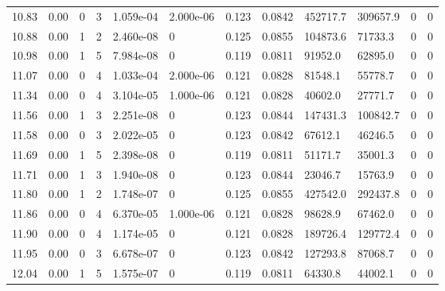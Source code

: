 \documentclass[preview]{standalone}
\begin{document}
{{{\begin{tabular}{L{1.2cm}C{1.2cm} C{0.3cm}C{0.5cm} C{1.4cm}C{1.4cm} C{1.4cm}C{1.4cm} C{1.6cm}C{1.6cm} C{1.6cm}C{1.6cm}}
  10.83  &  0.00  & 0     &  3 &  1.059e-04  & 2.000e-06  &  0.123&   0.0842& 452717.7 & 309657.9   &  0 & 0  \\ 
  10.88  &  0.00  & 1     &  2 &  2.460e-08  & 0  &  0.125&   0.0855& 104873.6 & 71733.3   &  0 & 0  \\ 
  10.98  &  0.00  & 1     &  5 &  7.984e-08  & 0  &  0.119&   0.0811& 91952.0 & 62895.0   &  0 & 0  \\ 
  11.07  &  0.00  & 0     &  4 &  1.033e-04  & 2.000e-06  &  0.121&   0.0828& 81548.1 & 55778.7   &  0 & 0  \\ 
  11.34  &  0.00  & 0     &  4 &  3.104e-05  & 1.000e-06  &  0.121&   0.0828& 40602.0 & 27771.7   &  0 & 0  \\ 
  11.56  &  0.00  & 1     &  3 &  2.251e-08  & 0  &  0.123&   0.0844& 147431.3 & 100842.7   &  0 & 0  \\ 
  11.58  &  0.00  & 0     &  3 &  2.022e-05  & 0  &  0.123&   0.0842& 67612.1 & 46246.5   &  0 & 0  \\ 
  11.69  &  0.00  & 1     &  5 &  2.398e-08  & 0  &  0.119&   0.0811& 51171.7 & 35001.3   &  0 & 0  \\ 
  11.71  &  0.00  & 1     &  3 &  1.940e-08  & 0  &  0.123&   0.0844& 23046.7 & 15763.9   &  0 & 0  \\ 
  11.80  &  0.00  & 1     &  2 &  1.748e-07  & 0  &  0.125&   0.0855& 427542.0 & 292437.8   &  0 & 0  \\ 
  11.86  &  0.00  & 0     &  4 &  6.370e-05  & 1.000e-06  &  0.121&   0.0828& 98628.9 & 67462.0   &  0 & 0  \\ 
  11.90  &  0.00  & 0     &  4 &  1.174e-05  & 0  &  0.121&   0.0828& 189726.4 & 129772.4   &  0 & 0  \\ 
  11.95  &  0.00  & 0     &  3 &  6.678e-07  & 0  &  0.123&   0.0842& 127293.8 & 87068.7   &  0 & 0  \\ 
  12.04  &  0.00  & 1     &  5 &  1.575e-07  & 0  &  0.119&   0.0811& 64330.8 & 44002.1   &  0 & 0  \\ 
\hline 
\end{tabular} 

}}}
\end{document}
